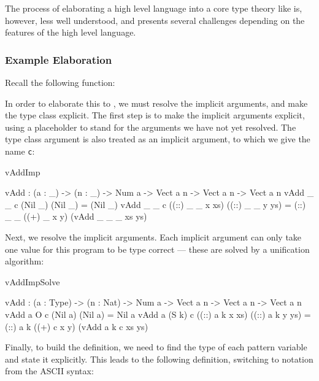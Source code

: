 The process of elaborating a high level language into a core type theory like \TT{} is,
however, less well understood, and presents several challenges depending on the
features of the high level language. 

\subsubsection{Example Elaboration}

Recall the following \Idris{} function:


\noindent
In order to elaborate
this to \TT{}, we must resolve the implicit arguments, and make the type class explicit.
The first step is to make the implicit arguments explicit, using a placeholder
to stand for the arguments we have not yet resolved. The type class argument is
also treated as an implicit argument, to which we give the name \texttt{c}:

\begin{SaveVerbatim}{vAddImp}

vAdd : (a : _) -> (n : _) -> Num a -> Vect a n -> Vect a n -> Vect a n
vAdd _ _ c (Nil _)         (Nil _)         = (Nil _)
vAdd _ _ c ((::) _ _ x xs) ((::) _ _ y ys) 
                = (::) _ _ ((+) _ x y) (vAdd _ _ _ xs ys)

\end{SaveVerbatim}

Next, we resolve the implicit arguments. Each implicit argument can only take
one value for this program to be type correct --- these are solved by a unification
algorithm:

\begin{SaveVerbatim}{vAddImpSolve}

vAdd : (a : Type) -> (n : Nat) -> Num a -> Vect a n -> Vect a n -> Vect a n
vAdd a O     c (Nil a)         (Nil a)         = Nil a
vAdd a (S k) c ((::) a k x xs) ((::) a k y ys) 
                = (::) a k ((+) c x y) (vAdd a k c xs ys)

\end{SaveVerbatim}

Finally, to build the \TT{} definition, we need to find the type of each
pattern variable and state it explicitly. This leads to the following
\TT{} definition, switching to \TT{} notation from the ASCII \Idris{}
syntax:

